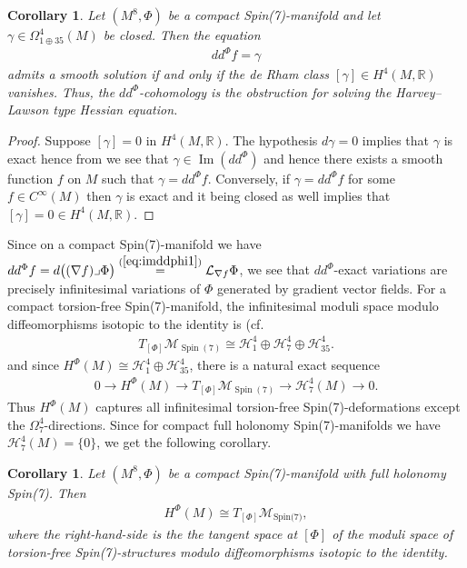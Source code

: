 \documentclass[10pt,a4paper,reqno]{article}
\newtheorem{corollary}[theorem]{Corollary}
\theoremstyle{definition}
\numberwithin{equation}{section}
\def\bR{\mathbb R}
\def\del{\nabla}
\def\ddphi{dd^{\Phi}}
\def\cH{\mathcal{H}}
\def\cL{\mathcal{L}}
\def\cM{\mathcal{M}}
\DeclareMathOperator{\Ima}{Im}
\begin{document}
\begin{corollary}
Let $(M^8, \Phi)$ be a compact Spin(7)-manifold and let $\gamma\in \Omega^4_{1\oplus 35}(M)$ be closed. Then the equation
\begin{align}
\ddphi f=\gamma
\end{align}
admits a smooth solution if and only if the de Rham class $[\gamma]\in H^4(M, \bR)$ vanishes. Thus, the $\ddphi$-cohomology is the obstruction for solving the Harvey--Lawson type Hessian equation.
\end{corollary}

\begin{proof}
Suppose $[\gamma]=0$ in $H^4(M, \bR)$. The hypothesis $d\gamma=0$ implies that $\gamma$ is exact hence from  we see that $\gamma\in \Ima(\ddphi)$ and hence there exists a smooth function $f$ on $M$ such that $\gamma=\ddphi f$. Conversely, if $\gamma=\ddphi f$ for some $f\in C^{\infty}(M)$ then $\gamma$ is exact and it being closed as well implies that $[\gamma]=0\in H^4(M, \bR)$.
\end{proof}


Since on a compact Spin(7)-manifold we have $dd^\Phi f =d\bigl((\nabla f)\lrcorner\Phi\bigr) \stackrel{(\ref{eq:imddphi1})}{=} \cL_{\del f} \Phi$, we see that $dd^\Phi$-exact variations are precisely infinitesimal variations of $\Phi$ generated by gradient vector fields. For a compact torsion-free Spin(7)-manifold, the infinitesimal moduli space modulo diffeomorphisms isotopic to the identity is (cf. \cite[Thm. 10.7.1]{joycebook}
\begin{align*}
T_{[\Phi]}\mathcal M_{\operatorname{Spin}(7)} \cong
\mathcal H^4_1\oplus\mathcal H^4_7\oplus\mathcal H^4_{35}.
\end{align*}
and since $H^\Phi(M) \cong \mathcal H^4_1\oplus\mathcal H^4_{35}$, there is a natural exact sequence
\begin{align*}
0\longrightarrow H^\Phi(M) \longrightarrow T_{[\Phi]}\mathcal M_{\operatorname{Spin}(7)}\longrightarrow \mathcal H^4_7(M)\longrightarrow 0.
\end{align*}
Thus $H^\Phi(M)$ captures all infinitesimal torsion-free Spin(7)-deformations except the $\Omega^4_7$-directions. Since for compact full holonomy Spin(7)-manifolds we have
$\cH^4_7(M)=\{0\}$, we get the following corollary.

\begin{corollary}
Let $(M^8, \Phi)$ be a compact Spin(7)-manifold with full holonomy Spin(7). Then
\begin{align*}
H^{\Phi}(M) \cong T_{[\Phi]}\cM_{\text{Spin(7)}},
\end{align*}
where the right-hand-side is the the tangent space at $[\Phi]$ of the moduli space of torsion-free Spin(7)-structures modulo diffeomorphisms isotopic to the identity. 
\end{corollary}
\end{document}
